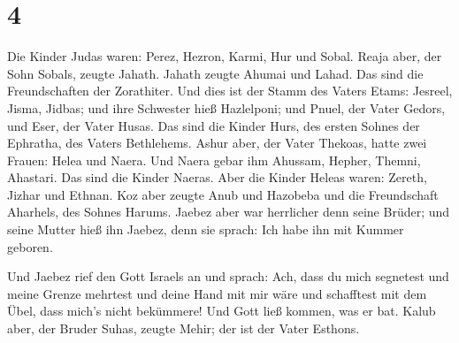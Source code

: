 \hypertarget{section-3}{%
\section{4}\label{section-3}}

 Die Kinder Judas waren: Perez, Hezron, Karmi, Hur und
Sobal.  Reaja aber, der Sohn Sobals, zeugte Jahath. Jahath
zeugte Ahumai und Lahad. Das sind die Freundschaften der Zorathiter.
 Und dies ist der Stamm des Vaters Etams: Jesreel, Jisma,
Jidbas; und ihre Schwester hieß Hazlelponi;  und Pnuel,
der Vater Gedors, und Eser, der Vater Husas. Das sind die Kinder Hurs,
des ersten Sohnes der Ephratha, des Vaters Bethlehems. 
Ashur aber, der Vater Thekoas, hatte zwei Frauen: Helea und Naera.
 Und Naera gebar ihm Ahussam, Hepher, Themni, Ahastari.
Das sind die Kinder Naeras.  Aber die Kinder Heleas waren:
Zereth, Jizhar und Ethnan.  Koz aber zeugte Anub und
Hazobeba und die Freundschaft Aharhels, des Sohnes Harums.
 Jaebez aber war herrlicher denn seine Brüder; und seine
Mutter hieß ihn Jaebez, denn sie sprach: Ich habe ihn mit Kummer
geboren.

 Und Jaebez rief den Gott Israels an und sprach: Ach,
dass du mich segnetest und meine Grenze mehrtest und deine Hand mit mir
wäre und schafftest mit dem Übel, dass mich's nicht bekümmere! Und Gott
ließ kommen, was er bat.  Kalub aber, der Bruder Suhas,
zeugte Mehir; der ist der Vater Esthons.

